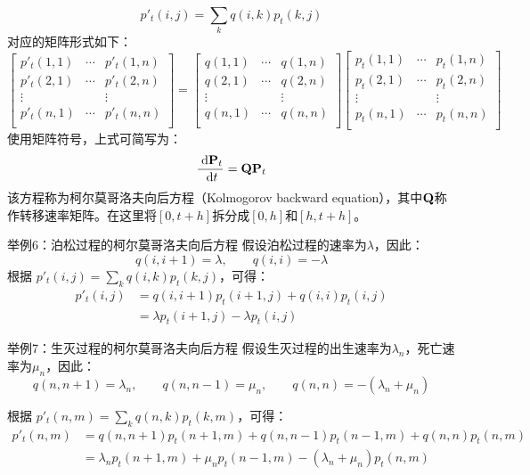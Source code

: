 \documentclass[t]{beamer}
\newcommand{\dif}{{\;\rm d}}
\begin{document}
    \begin{frame}{}\normalsize
      \[p'_t(i,j)=\sum_k q(i,k)p_t(k,j)\]
    对应的矩阵形式如下：
    \[\begin{bmatrix}
    p'_t(1,1)& \cdots &p'_t(1,n)\\
    p'_t(2,1)& \cdots &p'_t(2,n)\\
    \vdots&  &\vdots\\
    p'_t(n,1)& \cdots &p'_t(n,n)\\
    \end{bmatrix}=
    \begin{bmatrix}
    q(1,1)& \cdots &q(1,n)\\
    q(2,1)& \cdots &q(2,n)\\
    \vdots&  &\vdots\\
    q(n,1)& \cdots &q(n,n)\\
    \end{bmatrix}\begin{bmatrix}
    p_t(1,1)& \cdots &p_t(1,n)\\
    p_t(2,1)& \cdots &p_t(2,n)\\
    \vdots&  &\vdots\\
    p_t(n,1)& \cdots &p_t(n,n)\\
    \end{bmatrix}
     \]
     使用矩阵符号，上式可简写为：
     \[\frac{\dif {\bf P}_t}{\dif t}={\bf Q}{\bf P}_t \]
     该方程称为柯尔莫哥洛夫向后方程（Kolmogorov backward equation），其中${\bf Q}$称作{转移速率矩阵}。在这里将$[0,t+h]$拆分成$[0,h]$和$[h,t+h]$。
\end{frame}

\begin{frame}{举例6：泊松过程的柯尔莫哥洛夫向后方程}
  假设泊松过程的速率为$\lambda$，因此：
  \[q(i,i+1)=\lambda,\qquad q(i,i)=-\lambda \]
  根据
  $p'_t(i,j)=\sum_k q(i,k)p_t(k,j)$，可得：
  \[\begin{split}
  p'_t(i,j)&=q(i,i+1)p_t(i+1,j)+q(i,i)p_t(i,j)\\
  &=\lambda p_t(i+1,j)-\lambda p_t(i,j)
  \end{split} \]
\end{frame}

\begin{frame}{举例7：生灭过程的柯尔莫哥洛夫向后方程}
  假设生灭过程的出生速率为$\lambda_n$，死亡速率为$\mu_n$，因此：
  \[q(n,n+1)=\lambda_n,\qquad q(n,n-1)=\mu_n,\qquad q(n,n)=-(\lambda_n+\mu_n) \]
  
根据
$p'_t(n,m)=\sum_k q(n,k)p_t(k,m)$，可得：
\[\begin{split}
p'_t(n,m)&=q(n,n+1)p_t(n+1,m)+q(n,n-1)p_t(n-1,m)+q(n,n)p_t(n,m)\\
&=\lambda_n p_t(n+1,m)+\mu_n p_t(n-1,m)-(\lambda_n+\mu_n)p_t(n,m)
\end{split} \]	
\end{frame}
\end{document}
